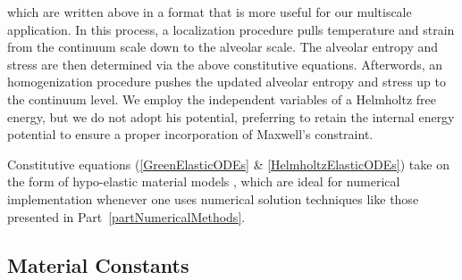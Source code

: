 which are written above in a format that is more useful for our multi\-scale application.  In this process, a localization procedure pulls temperature and strain from the continuum scale down to the alveolar scale.  The alveolar entropy and stress are then determined via the above constitutive equations.  Afterwords, an homogenization procedure pushes the updated alveolar entropy and stress up to the continuum level.  We employ the independent variables of a Helmholtz free energy, but we do not adopt his potential, preferring to retain the internal energy potential to ensure a proper incorporation of Maxwell's constraint.  

Constitutive equations (\ref{GreenElasticODEs} \& \ref{HelmholtzElasticODEs}) take on the form of hypo-elastic material models \cite{Truesdell55}, which are ideal for numerical implementation whenever one uses numerical solution techniques like those presented in Part~\ref{partNumericalMethods}.

\subsection{Material Constants}

